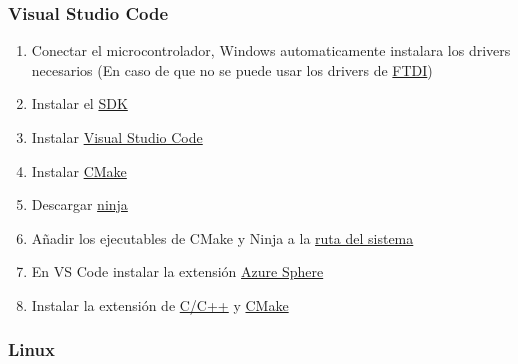 \subsubsection*{Visual Studio Code}
\begin{enumerate}
	\item 
	Conectar el microcontrolador, Windows automaticamente instalara los drivers necesarios (En caso de que no se puede usar los drivers de \href{https://www.ftdichip.com/Drivers/VCP.htm}{FTDI})
	\item 
	Instalar el \href{https://aka.ms/AzureSphereSDKDownload/Windows}{SDK}
	\item 
	Instalar \href{https://code.visualstudio.com/}{Visual Studio Code}
	\item 
	Instalar \href{https://cmake.org/download/}{CMake}
	\item 
	Descargar \href{https://github.com/ninja-build/ninja/releases}{ninja}
	\item 
	Añadir los ejecutables de CMake y Ninja a la \href{https://stackoverflow.com/questions/44272416/how-to-add-a-folder-to-path-environment-variable-in-windows-10-with-screensho}{ruta del sistema} 
	\item 
	En VS Code instalar la extensión \href{https://marketplace.visualstudio.com/items?itemName=ms-vscode.azure-sphere-tools}{Azure Sphere}
	\item Instalar la extensión de \href{https://marketplace.visualstudio.com/items?itemName=ms-vscode.cpptools}{C/C++} y \href{https://marketplace.visualstudio.com/items?itemName=ms-vscode.cmake-tools}{CMake}
\end{enumerate}

\subsubsection{Linux}
